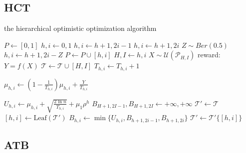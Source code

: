 \documentclass[a4paper,10pt]{article}
\begin{document}
\subsection{HCT}
\begin{algorithm}[!ht]
\caption{the hierarchical optimistic optimization algorithm}
\begin{algorithmic}[1]
		\State $P \gets {[0,1]}$
		\State $h,i\gets 0,1$
				\State $h,i \gets h+1,2i-1 $
				\State $h,i \gets h+1,2i $
			\Else
				\State $Z \sim Ber(0.5)$
				\State $h,i \gets h+1,2i-Z$
			\EndIf
			\State $P \gets P \cup {[h,i]}$
		\EndWhile
		\State $H,I \gets h,i$
		\State $X \sim \mathcal{U}(\mathcal{P}_{H,I})$
		\State reward: $Y = f(X)$
		\State $\mathcal{T} \gets \mathcal{T} \cup {[H,I]}$
			\State $T_{h,i} \gets T_{h,i}+1$
			\begin{large}
			\State $\mu_{h,i}\gets (1-\frac{1}{T_{h,i}})\mu_{h,i}+\frac{Y}{T_{h,i}}$
			\end{large}
		\EndFor
			\State $U_{h,i}\gets \mu_{h,i}+\sqrt{\frac{2\ln n}{T_{h,i}}}+\mu_1 \rho^h$
		\EndFor
		\State $B_{H+1,2I-1},B_{H+1,2I} \gets +\infty,+\infty$
		\State $\mathcal{T}' \gets \mathcal{T}$
			\State $[h,i] \gets \text{Leaf}(\mathcal{T}')$
			\State $B_{h,i} \gets \min\{U_{h,i},B_{h+1,2i-1},B_{h+1,2i}\}$
			\State $\mathcal{T}' \gets \mathcal{T}'\{[h,i]\}$
		\EndWhile
	\EndFor
\end{algorithmic}
\end{algorithm}
\subsection{ATB}


{}
\nocite{*}

\label{lastpage}
\end{document}

